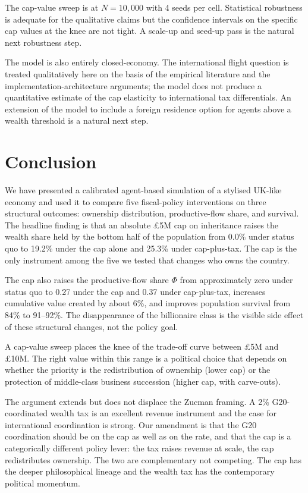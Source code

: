 \documentclass[11pt]{article}
\begin{document}
The cap-value sweep is at $N = 10{,}000$ with 4 seeds per cell.
Statistical robustness is adequate for the qualitative claims but
the confidence intervals on the specific cap values at the knee
are not tight.  A scale-up and seed-up pass is the natural next
robustness step.

The model is also entirely closed-economy.  The international
flight question is treated qualitatively here on the basis of the
empirical literature and the implementation-architecture arguments;
the model does not produce a quantitative estimate of the cap
elasticity to international tax differentials.  An extension of the
model to include a foreign residence option for agents above a
wealth threshold is a natural next step.

\section{Conclusion}

We have presented a calibrated agent-based simulation of a
stylised UK-like economy and used it to compare five fiscal-policy
interventions on three structural outcomes: ownership distribution,
productive-flow share, and survival.  The headline finding is that
an absolute \pounds 5M cap on inheritance raises the wealth share
held by the bottom half of the population from 0.0\% under status
quo to 19.2\% under the cap alone and 25.3\% under cap-plus-tax.
The cap is the only instrument among the five we tested that
changes who owns the country.

The cap also raises the productive-flow share $\Phi$ from
approximately zero under status quo to 0.27 under the cap and 0.37
under cap-plus-tax, increases cumulative value created by about
6\%, and improves population survival from 84\% to 91--92\%.  The
disappearance of the billionaire class is the visible side effect
of these structural changes, not the policy goal.

A cap-value sweep places the knee of the trade-off curve between
\pounds 5M and \pounds 10M.  The right value within this range is
a political choice that depends on whether the priority is the
redistribution of ownership (lower cap) or the protection of
middle-class business succession (higher cap, with carve-outs).

The argument extends but does not displace the Zucman framing.  A
2\% G20-coordinated wealth tax is an excellent revenue instrument
and the case for international coordination is strong.  Our
amendment is that the G20 coordination should be on the cap as
well as on the rate, and that the cap is a categorically
different policy lever: the tax raises revenue at scale, the cap
redistributes ownership.  The two are complementary not competing.
The cap has the deeper philosophical lineage
\citep{mill1848principles, carnegie1889wealth, rignano1924bequest,
atkinson2015inequality} and the wealth tax has the contemporary
political momentum.
\end{document}
